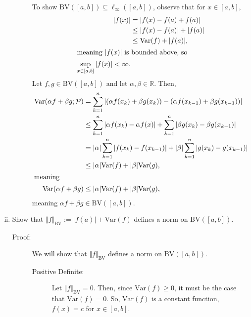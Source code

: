 \documentclass[10pt]{extarticle}
\newcommand{\R}{\mathbb{R}}
\begin{document}
\begin{enumerate}[(i)]
\begin{description}
          To show $\text{BV}([a,b])\subseteq \ell_{\infty}([a,b])$, observe that for $x\in [a,b]$,
          \begin{align*}
            |f(x)| &= |f(x)-f(a) + f(a)|\\
                   &\leq |f(x)-f(a)| + |f(a)|\\
                   &\leq \text{Var}(f) + |f(a)|,\\
           \shortintertext{meaning $|f(x)|$ is bounded above, so}
           \sup_{x\in[a,b]}|f(x)| < \infty.
          \end{align*}
          Let $f,g\in \text{BV}([a,b])$ and let $\alpha,\beta \in \R$. Then,
          \begin{align*}
            \text{Var}(\alpha f + \beta g;\mathcal{P}) &= \sum_{k=1}^{n}|(\alpha f(x_k) + \beta g(x_k)) - (\alpha f(x_{k-1}) + \beta g(x_{k-1}))|\\
                                                       &\leq\sum_{k=1}^{n}|\alpha f(x_k)-\alpha f(x)| + \sum_{k=1}^{n}|\beta g(x_k)-\beta g(x_{k-1})|\\
                                                       &= |\alpha|\sum_{k=1}^{n}|f(x_k)-f(x_{k-1})| + |\beta|\sum_{k=1}^{n}|g(x_k) - g(x_{k-1})|\\
                                                       &\leq |\alpha|\text{Var}(f) + |\beta|\text{Var}(g),\\
                                                       \shortintertext{meaning}
            \text{Var}(\alpha f + \beta g) &\leq |\alpha|\text{Var}(f) + |\beta|\text{Var}(g),
          \end{align*}
          meaning $\alpha f + \beta g\in \text{BV}([a,b])$.
      \end{description}
    \item Show that $\Vert f\Vert_{\text{BV}} := |f(a)| + \text{Var}(f)$ defines a norm on $\text{BV}([a,b])$.
      \begin{description}
        \item[Proof:] We will show that $\Vert f \Vert_{\text{BV}}$ defines a norm on $\text{BV}([a,b])$.
          \begin{description}
            \item[Positive Definite:] Let $\Vert f \Vert_{\text{BV}} = 0$. Then, since $\text{Var}(f) \geq 0$, it must be the case that $\text{Var}(f) = 0$. So, $\text{Var}(f)$ is a constant function, $f(x) = c$ for $x\in [a,b]$.\\


\end{description}
\end{description}
\end{enumerate}
\end{document}

